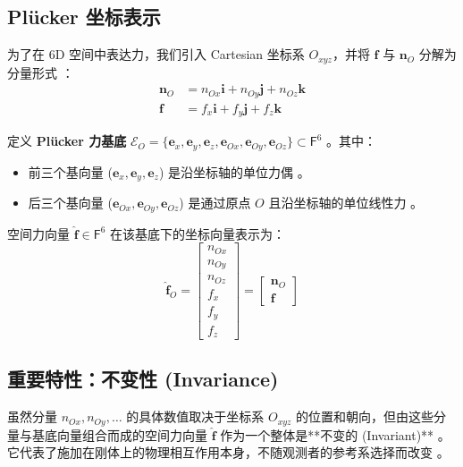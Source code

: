 \subsection{Plücker 坐标表示}
为了在 6D 空间中表达力，我们引入 Cartesian 坐标系 $O_{xyz}$，并将 $\bm{f}$ 与 $\bm{n}_O$ 分解为分量形式 ：
\begin{align*}
    \bm{n}_O &= n_{Ox}\bm{i} + n_{Oy}\bm{j} + n_{Oz}\bm{k} \\
    \bm{f} &= f_x\bm{i} + f_y\bm{j} + f_z\bm{k}
\end{align*}

定义 \textbf{Plücker 力基底} $\mathcal{E}_O = \{ \bm{e}_x, \bm{e}_y, \bm{e}_z, \bm{e}_{Ox}, \bm{e}_{Oy}, \bm{e}_{Oz} \} \subset \mathsf{F}^6$ 。其中：
\begin{itemize}
    \item 前三个基向量 ($\bm{e}_x, \bm{e}_y, \bm{e}_z$) 是沿坐标轴的单位力偶 。
    \item 后三个基向量 ($\bm{e}_{Ox}, \bm{e}_{Oy}, \bm{e}_{Oz}$) 是通过原点 $O$ 且沿坐标轴的单位线性力 。
\end{itemize}

空间力向量 $\hat{\bm{f}} \in \mathsf{F}^6$ 在该基底下的坐标向量表示为：
\begin{equation}
\hat{\bm{f}}_O = \begin{bmatrix} n_{Ox} \\ n_{Oy} \\ n_{Oz} \\ f_x \\ f_y \\ f_z \end{bmatrix} = \begin{bmatrix} \bm{n}_O \\ \bm{f} \end{bmatrix} \tag{2.9}
\end{equation}


\subsection{重要特性：不变性 (Invariance)}
虽然分量 $n_{Ox}, n_{Oy}, \dots$ 的具体数值取决于坐标系 $O_{xyz}$ 的位置和朝向，但由这些分量与基底向量组合而成的空间力向量 $\hat{\bm{f}}$ 作为一个整体是**不变的 (Invariant)** 。它代表了施加在刚体上的物理相互作用本身，不随观测者的参考系选择而改变 。

